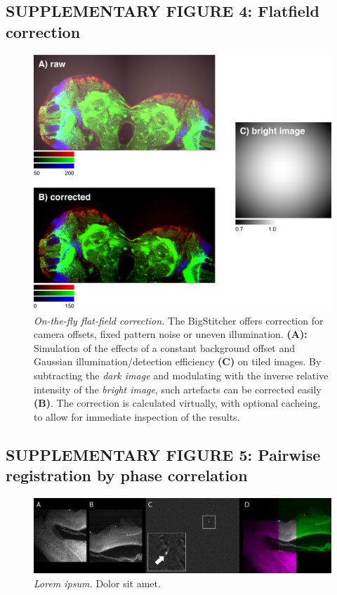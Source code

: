 \documentclass[]{spie}  %
\begin{document}
\subsection*{SUPPLEMENTARY FIGURE 4: Flatfield correction}
\vspace{1mm}
\begin{figure}[h!]
\includegraphics[width=\textwidth]{fig-flatfield.png}
\vspace{-2.0mm}
\caption{\hspace{-0.5mm} \emph{On-the-fly flat-field correction.} The BigStitcher offers correction for camera offsets, fixed pattern noise or uneven illumination. \textbf{(A):}  Simulation of the effects of a constant background offset and Gaussian illumination/detection efficiency \textbf{(C)} on tiled images. By subtracting the \emph{dark image} and modulating with the inverse relative intensity of the \emph{bright image}, such artefacts can be corrected easily \textbf{(B)}. The correction is calculated virtually, with optional cacheing, to allow for immediate inspection of the results.
}
\label{fig:sup-fig-flatfield}
\end{figure}

\pagebreak


\subsection*{SUPPLEMENTARY FIGURE 5: Pairwise registration by phase correlation}
\vspace{1mm}
\begin{figure}[h!]
\includegraphics[width=\textwidth]{fig-stitching.png}
\vspace{-2.0mm}
\caption{\hspace{-0.5mm} \emph{Lorem ipsum.} Dolor sit amet.
}
\label{fig:sup-fig-stitching}
\end{figure}
\end{document}
